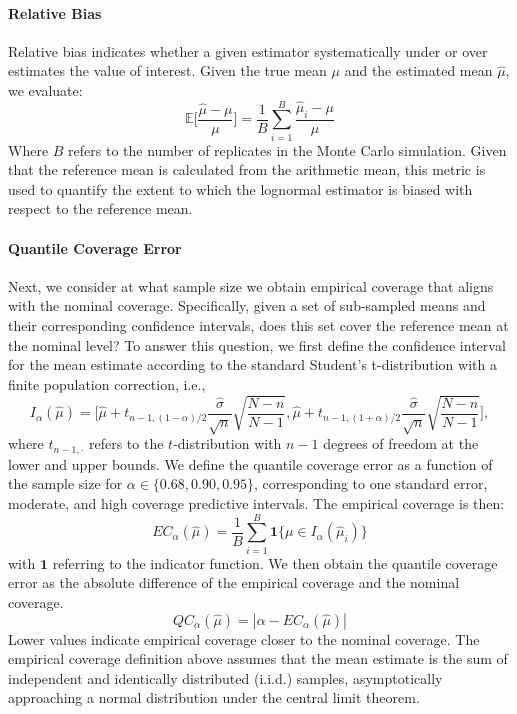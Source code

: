 \paragraph{Relative Bias}
Relative bias indicates whether a given estimator systematically under or over estimates the value of interest. Given the true mean $\mu$ and the estimated mean $\hat{\mu}$, we evaluate:
\begin{equation} \label{eq:relative_bias}
 \mathbb{E}\bigg[\frac{\hat{\mu}-\mu}{\mu}\bigg] = \frac{1}{B}\sum_{i=1}^B \frac{\hat{\mu}_i - \mu}{\mu}
\end{equation}
Where $B$ refers to the number of replicates in the Monte Carlo simulation. Given that the reference mean is calculated from the arithmetic mean, this metric is used to quantify the extent to which the lognormal estimator is biased with respect to the reference mean. 

\paragraph{Quantile Coverage Error}
Next, we consider at what sample size we obtain empirical coverage that aligns with the nominal coverage. Specifically, given a set of sub-sampled means and their corresponding confidence intervals, does this set cover the reference mean at the nominal level? To answer this question, we first define the confidence interval for the mean estimate according to the standard Student's t-distribution with a finite population correction, i.e., 
\begin{equation}
 I_\alpha (\hat{\mu})=\bigg[\hat{\mu} + t_{n-1, (1-\alpha)/2}\frac{\hat{\sigma}}{\sqrt{n}}\sqrt{\frac{N-n}{N-1}}, \hat{\mu} + t_{n-1, (1+\alpha)/2}\frac{\hat{\sigma}}{\sqrt{n}}\sqrt{\frac{N-n}{N-1}}\bigg],
\end{equation}
where $t_{n-1, \cdot}$ refers to the $t$-distribution with $n-1$ degrees of freedom at the lower and upper bounds. We define the quantile coverage error as a function of the sample size for $\alpha \in \{0.68, 0.90, 0.95\}$, corresponding to one standard error, moderate, and high coverage predictive intervals. The empirical coverage is then:
\begin{equation}
 EC_\alpha(\hat{\mu}) = \frac{1}{B}\sum_{i=1}^B \mathbf{1}\{\mu \in I_\alpha(\hat{\mu}_i)\}
\end{equation}
with $\mathbf{1}$ referring to the indicator function. We then obtain the quantile coverage error as the absolute difference of the empirical coverage and the nominal coverage.
\begin{equation}
QC_\alpha(\hat{\mu}) = |\alpha- EC_\alpha(\hat{\mu})|
\end{equation}
Lower values indicate empirical coverage closer to the nominal coverage. The empirical coverage definition above assumes that the mean estimate is the sum of independent and identically distributed (i.i.d.) samples, asymptotically approaching a normal distribution under the central limit theorem. 

